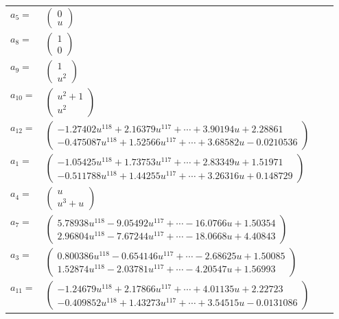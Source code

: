 \documentclass[1p]{elsarticle_modified}
\theoremstyle{definition}
\begin{document}
\begin{tabular}{m{7pt} m{180pt} m{7pt} m{180pt} }
\flushright $a_{5}=$&$\begin{pmatrix}0\\u\end{pmatrix}$ \\
\flushright $a_{8}=$&$\begin{pmatrix}1\\0\end{pmatrix}$ \\
\flushright $a_{9}=$&$\begin{pmatrix}1\\u^2\end{pmatrix}$ \\
\flushright $a_{10}=$&$\begin{pmatrix}u^2+1\\u^2\end{pmatrix}$ \\
\flushright $a_{12}=$&$\begin{pmatrix}-1.27402 u^{118}+2.16379 u^{117}+\cdots+3.90194 u+2.28861\\-0.475087 u^{118}+1.52566 u^{117}+\cdots+3.68582 u-0.0210536\end{pmatrix}$ \\
\flushright $a_{1}=$&$\begin{pmatrix}-1.05425 u^{118}+1.73753 u^{117}+\cdots+2.83349 u+1.51971\\-0.511788 u^{118}+1.44255 u^{117}+\cdots+3.26316 u+0.148729\end{pmatrix}$ \\
\flushright $a_{4}=$&$\begin{pmatrix}u\\u^3+u\end{pmatrix}$ \\
\flushright $a_{7}=$&$\begin{pmatrix}5.78938 u^{118}-9.05492 u^{117}+\cdots-16.0766 u+1.50354\\2.96804 u^{118}-7.67244 u^{117}+\cdots-18.0668 u+4.40843\end{pmatrix}$ \\
\flushright $a_{3}=$&$\begin{pmatrix}0.800386 u^{118}-0.654146 u^{117}+\cdots-2.68625 u+1.50085\\1.52874 u^{118}-2.03781 u^{117}+\cdots-4.20547 u+1.56993\end{pmatrix}$ \\
\flushright $a_{11}=$&$\begin{pmatrix}-1.24679 u^{118}+2.17866 u^{117}+\cdots+4.01135 u+2.22723\\-0.409852 u^{118}+1.43273 u^{117}+\cdots+3.54515 u-0.0131086\end{pmatrix}$ \\

\end{tabular}
\end{document}
